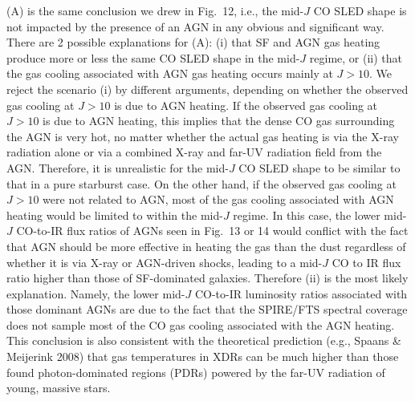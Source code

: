 \documentclass[preprint]{aastex}
\begin{document}
(A) is the same conclusion we drew in Fig.~12, i.e., the mid-$J$ CO SLED
shape is not impacted by the presence of an AGN in any obvious and 
significant way.
There are 2 possible explanations for (A): (i) that SF and AGN gas heating
produce more or less the same CO SLED shape in the mid-$J$ regime,
or (ii) that the gas cooling associated with AGN gas heating occurs mainly 
at $J > 10$.   We reject the scenario (i) by different arguments,  
depending on whether the observed gas cooling at $J > 10$ is due to AGN 
heating. If the observed gas cooling at $J > 10$ is due to AGN heating,
this implies that the dense CO gas surrounding the AGN is very hot, 
no matter whether the actual gas heating is via the X-ray radiation 
alone or via a combined X-ray and far-UV radiation field from the AGN. 
Therefore, it is unrealistic for the mid-$J$ CO SLED shape to be similar 
to that in a pure starburst case.  
On the other hand, if the observed gas cooling at $J > 10$ were not 
related to AGN, most of the gas cooling associated with AGN heating 
would be limited to within the mid-$J$ regime. In this case, the lower mid-$J$ 
CO-to-IR 
flux ratios of AGNs seen in Fig.~13 or 14 would conflict with the fact 
that AGN should be more effective in heating the gas than the dust regardless 
of whether it is via X-ray or AGN-driven shocks,  leading to a mid-$J$
CO to IR flux ratio higher than those of SF-dominated galaxies.  
Therefore (ii) is the most likely explanation. Namely, 
the lower mid-$J$ CO-to-IR luminosity ratios associated with those dominant
AGNs are due to the fact that the SPIRE/FTS spectral coverage does not sample
most of the CO gas cooling associated with the AGN heating.   
This conclusion is also consistent with the theoretical 
prediction (e.g., Spaans \& Meijerink 2008) that gas temperatures in 
XDRs can be much higher than those found photon-dominated regions (PDRs)
powered by the far-UV radiation of young, massive stars.
\end{document}
